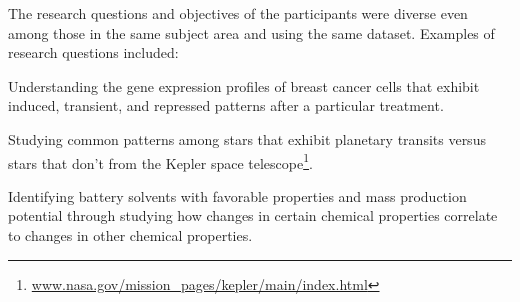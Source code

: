 \par The research questions and objectives of the participants were diverse even among those in the same subject area and using the same dataset. Examples of research questions included: 
\begin{denselist}
\item Understanding the gene expression profiles of breast cancer cells that exhibit induced, transient, and  repressed patterns after a particular treatment.
\item Studying common patterns among stars that exhibit planetary transits versus stars that don't from the Kepler space telescope\footnote{\url{www.nasa.gov/mission_pages/kepler/main/index.html}}.
\item Identifying battery solvents with favorable properties and mass production potential through studying how changes in certain chemical properties correlate to changes in other chemical properties. \end{denselist}

